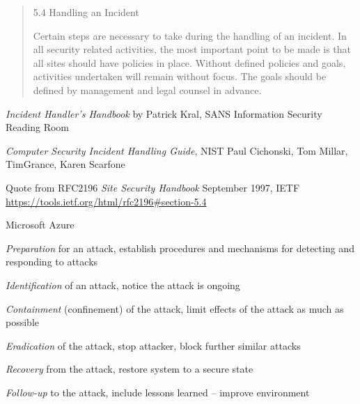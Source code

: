 \documentclass[Screen16to9,17pt]{foils}
\begin{document}

\begin{quote}
  5.4  Handling an Incident

     Certain steps are necessary to take during the handling of an
     incident.  In all security related activities, the most important
     point to be made is that all sites should have policies in place.
     Without defined policies and goals, activities undertaken will remain
     without focus. The goals should be defined by management and legal
     counsel in advance.
\end{quote}

\begin{list2}
\item \emph{Incident Handler's Handbook}
  by Patrick Kral, SANS Information Security Reading Room\\
  {\footnotesize {}}
  \item \emph{Computer Security
Incident Handling Guide}, NIST Paul Cichonski,
Tom Millar,
TimGrance,
Karen Scarfone\\ {\footnotesize{}}
\item Quote from RFC2196 \emph{Site Security Handbook} September 1997, IETF\\
{\footnotesize\url{https://tools.ietf.org/html/rfc2196#section-5.4}}
\item {}
\item Microsoft Azure
\end{list2}



\begin{list2}
\item \emph{Preparation} for an attack, establish procedures and mechanisms for detecting and responding to attacks
\item \emph{Identification} of an attack, notice the attack is ongoing
\item \emph{Containment} (confinement) of the attack, limit effects of the attack as much as possible
\item \emph{Eradication} of the attack, stop attacker, block further similar attacks
\item \emph{Recovery} from the attack, restore system to a secure state
\item \emph{Follow-up} to the attack, include lessons learned -- improve environment
\end{list2}
\end{document}
